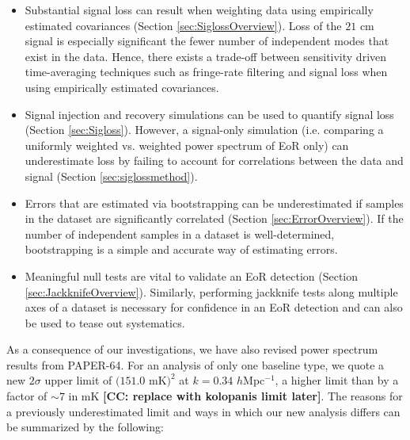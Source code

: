 \documentclass[preprint2,numberedappendix,tighten]{aastex6}  %
\newcommand{\cc}[1]{{\color{purple} \textbf{[CC: #1]}}}
\begin{document}
\begin{itemize}
\item Substantial signal loss can result when weighting data using empirically estimated covariances (Section 
\ref{sec:SiglossOverview}). Loss of the $21$ cm signal is especially significant the fewer number of independent modes that
exist in the data. Hence, there exists a trade-off between sensitivity driven 
time-averaging techniques such as fringe-rate filtering and signal loss when using empirically estimated covariances. 
\item Signal injection and recovery simulations can be used to quantify signal loss (Section \ref{sec:Sigloss}). However, a 
signal-only simulation (i.e. comparing a uniformly weighted vs. weighted power spectrum of EoR only) can underestimate loss by 
failing to account for correlations between the data and signal (Section \ref{sec:siglossmethod}).
\item Errors that are estimated via bootstrapping can be underestimated if samples in the dataset are significantly correlated 
(Section \ref{sec:ErrorOverview}). If the number of independent samples in a dataset is well-determined, bootstrapping is a 
simple and accurate way of estimating errors.
\item Meaningful null tests are vital to validate an EoR detection (Section \ref{sec:JackknifeOverview}). Similarly, performing 
jackknife tests along multiple axes of a dataset is necessary for confidence in an EoR detection and can also be used to tease 
out systematics.
\end{itemize}

As a consequence of our investigations, we have also revised power spectrum results from PAPER-64. For an analysis of only 
one baseline type, we quote a new $2\sigma$ upper limit of $(151.0$ mK$)^{2}$ at $k=0.34$ $h$Mpc$^{-1}$, a higher limit than 
 by a factor of $\sim7$ in mK \cc{replace with kolopanis limit later}. The reasons for a previously underestimated limit and 
ways in which our new analysis differs can be summarized by the following:
\end{document}
